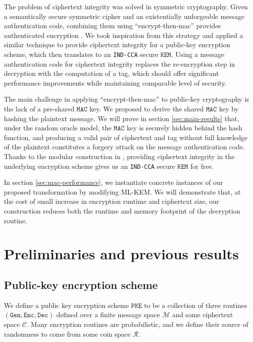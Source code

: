 \documentclass[floatrow,journal=tches,submission]{iacrtrans}
\newcommand{\pke}{\texttt{PKE}}
\newcommand{\keygen}{\texttt{Gen}}
\newcommand{\encrypt}{\texttt{Enc}}
\newcommand{\decrypt}{\texttt{Dec}}
\newcommand{\kem}{\texttt{KEM}}
\newcommand{\mac}{\texttt{MAC}}
\begin{document}
The problem of ciphertext integrity was solved in symmetric cryptography. Given a semantically secure symmetric cipher and an existentially unforgeable message authentication code, combining them using ``encrypt-then-mac'' provides authenticated encryption \cite{bellare2000authenticated}. We took inspiration from this strategy and applied a similar technique to provide ciphertext integrity for a public-key encryption scheme, which then translates to an \texttt{IND-CCA} secure $\kem$. Using a message authentication code for ciphertext integrity replaces the re-encryption step in decryption with the computation of a tag, which should offer significant performance improvements while maintaining comparable level of security.

The main challenge in applying ``encrypt-then-mac'' to public-key cryptography is the lack of a pre-shared $\mac$ key. We proposed to derive the shared $\mac$ key by hashing the plaintext message. We will prove in section \ref{sec:main-results} that, under the random oracle model, the $\mac$ key is securely hidden behind the hash function, and producing a valid pair of ciphertext and tag without full knowledge of the plaintext constitutes a forgery attack on the message authentication code. Thanks to the modular construction in \cite{hofheinz2017modular}, providing ciphertext integrity in the underlying encryption scheme gives us an \texttt{IND-CCA} secure $\kem$ for free.

In section \ref{sec:mac-performance}, we instantiate concrete instances of our proposed transformation by modifying ML-KEM. We will demonstrate that, at the cost of small increase in encryption runtime and ciphertext size, our construction reduces both the runtime and memory footprint of the decryption routine. %

\section{Preliminaries and previous results}

\subsection{Public-key encryption scheme}
We define a public key encryption scheme $\pke$ to be a collection of three routines $(\keygen, \encrypt, \decrypt)$ defined over a finite message space $\mathcal{M}$ and some ciphertext space $\mathcal{C}$. Many encryption routines are probabilistic, and we define their source of randomness to come from some coin space $\mathcal{R}$.
\end{document}
